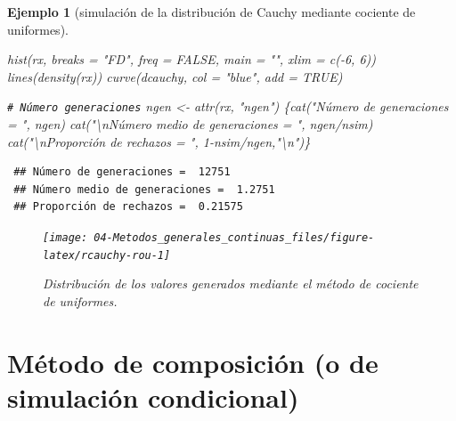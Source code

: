 \documentclass[
  10pt,
]{book}
\newenvironment{Shaded}{\begin{snugshade}}{\end{snugshade}}
\newcommand{\AttributeTok}[1]{\textcolor[rgb]{0.77,0.63,0.00}{#1}}
\newcommand{\CommentTok}[1]{\textcolor[rgb]{0.56,0.35,0.01}{\textit{#1}}}
\newcommand{\ConstantTok}[1]{\textcolor[rgb]{0.00,0.00,0.00}{#1}}
\newcommand{\DecValTok}[1]{\textcolor[rgb]{0.00,0.00,0.81}{#1}}
\newcommand{\FunctionTok}[1]{\textcolor[rgb]{0.00,0.00,0.00}{#1}}
\newcommand{\NormalTok}[1]{#1}
\newcommand{\OtherTok}[1]{\textcolor[rgb]{0.56,0.35,0.01}{#1}}
\newcommand{\SpecialCharTok}[1]{\textcolor[rgb]{0.00,0.00,0.00}{#1}}
\newcommand{\StringTok}[1]{\textcolor[rgb]{0.31,0.60,0.02}{#1}}
\theoremstyle{break}
\newtheorem{example}{Ejemplo}[chapter]
\theoremstyle{nonumberplain}
\renewcommand{\CommentTok}[1]{\textcolor[rgb]{0.41,0.41,0.41}{\texttt{#1}}}
\begin{document}
\begin{example}[simulación de la distribución de Cauchy mediante cociente de uniformes]
\begin{Shaded}
\begin{Highlighting}[]
\FunctionTok{hist}\NormalTok{(rx, }\AttributeTok{breaks =} \StringTok{"FD"}\NormalTok{, }\AttributeTok{freq =} \ConstantTok{FALSE}\NormalTok{, }\AttributeTok{main =} \StringTok{""}\NormalTok{, }\AttributeTok{xlim =} \FunctionTok{c}\NormalTok{(}\SpecialCharTok{{-}}\DecValTok{6}\NormalTok{, }\DecValTok{6}\NormalTok{))}
\FunctionTok{lines}\NormalTok{(}\FunctionTok{density}\NormalTok{(rx))}
\FunctionTok{curve}\NormalTok{(dcauchy, }\AttributeTok{col =} \StringTok{"blue"}\NormalTok{, }\AttributeTok{add =} \ConstantTok{TRUE}\NormalTok{)}

\CommentTok{\# Número generaciones}
\NormalTok{ngen }\OtherTok{\textless{}{-}} \FunctionTok{attr}\NormalTok{(rx, }\StringTok{"ngen"}\NormalTok{)}
\NormalTok{\{}\FunctionTok{cat}\NormalTok{(}\StringTok{"Número de generaciones = "}\NormalTok{, ngen)}
\FunctionTok{cat}\NormalTok{(}\StringTok{"}\SpecialCharTok{\textbackslash{}n}\StringTok{Número medio de generaciones = "}\NormalTok{, ngen}\SpecialCharTok{/}\NormalTok{nsim)}
\FunctionTok{cat}\NormalTok{(}\StringTok{"}\SpecialCharTok{\textbackslash{}n}\StringTok{Proporción de rechazos = "}\NormalTok{, }\DecValTok{1}\SpecialCharTok{{-}}\NormalTok{nsim}\SpecialCharTok{/}\NormalTok{ngen,}\StringTok{"}\SpecialCharTok{\textbackslash{}n}\StringTok{"}\NormalTok{)\}}
\end{Highlighting}
\end{Shaded}

\begin{verbatim}
 ## Número de generaciones =  12751
 ## Número medio de generaciones =  1.2751
 ## Proporción de rechazos =  0.21575
\end{verbatim}

\begin{figure}[!htbp]

{\centering \texttt{[image: 04-Metodos\_generales\_continuas\_files/figure-latex/rcauchy-rou-1]} 

}

\caption{Distribución de los valores generados mediante el método de cociente de uniformes.}\label{fig:rcauchy-rou}
\end{figure}

\end{example}

\hypertarget{composicion}{%
\section{Método de composición (o de simulación condicional)}\label{composicion}}
\end{document}
